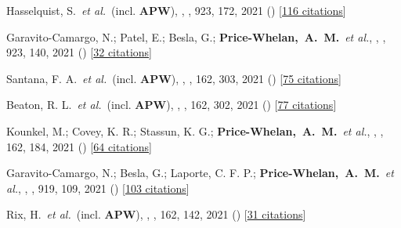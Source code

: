 {\item[{\color{deemph}\scriptsize95}]Hasselquist, S.~\textit{et al.}~(incl. \textbf{APW}), , \apj, 923, 172, 2021 () [\href{http://adsabs.harvard.edu/abs/2021ApJ...923..172H}{116 citations}]

\item[{\color{deemph}\scriptsize94}]Garavito-Camargo, N.; Patel, E.; Besla, G.; \textbf{Price-Whelan,~A.~M.}~\textit{et al.}, , \apj, 923, 140, 2021 () [\href{http://adsabs.harvard.edu/abs/2021ApJ...923..140G}{32 citations}]

\item[{\color{deemph}\scriptsize93}]Santana, F. A.~\textit{et al.}~(incl. \textbf{APW}), , \aj, 162, 303, 2021 () [\href{http://adsabs.harvard.edu/abs/2021AJ....162..303S}{75 citations}]

\item[{\color{deemph}\scriptsize92}]Beaton, R. L.~\textit{et al.}~(incl. \textbf{APW}), , \aj, 162, 302, 2021 () [\href{http://adsabs.harvard.edu/abs/2021AJ....162..302B}{77 citations}]

\item[{\color{deemph}\scriptsize91}]Kounkel, M.; Covey, K. R.; Stassun, K. G.; \textbf{Price-Whelan,~A.~M.}~\textit{et al.}, , \aj, 162, 184, 2021 () [\href{http://adsabs.harvard.edu/abs/2021AJ....162..184K}{64 citations}]

\item[{\color{deemph}\scriptsize90}]Garavito-Camargo, N.; Besla, G.; Laporte, C. F. P.; \textbf{Price-Whelan,~A.~M.}~\textit{et al.}, , \apj, 919, 109, 2021 () [\href{http://adsabs.harvard.edu/abs/2021ApJ...919..109G}{103 citations}]

\item[{\color{deemph}\scriptsize89}]Rix, H.~\textit{et al.}~(incl. \textbf{APW}), , \aj, 162, 142, 2021 () [\href{http://adsabs.harvard.edu/abs/2021AJ....162..142R}{31 citations}]

}
